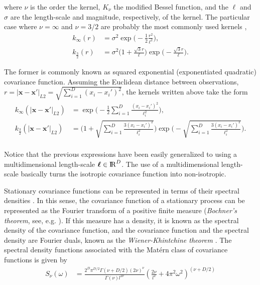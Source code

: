 \documentclass[]{interact}
\theoremstyle{plain}%
\theoremstyle{definition}
\theoremstyle{remark}
\begin{document}
\noindent where $\nu$ is the order the kernel, $K_{\nu}$ the modified Bessel function, and the $\ell$ and $\sigma$ are the length-scale and magnitude, respectively, of the kernel. The particular case where $\nu=\infty$ and $\nu=3/2$ are probably the most commonly used kernels \citep{rasmussen2006gaussian}, 
%
\begin{align*}
k_{\infty}(r)&=\sigma^2 \exp\bigg(-\frac{1}{2} \frac{r^2}{\ell^2}\bigg),  \\
k_{\frac{3}{2}}(r)&=\sigma^2\bigg(1+\frac{\sqrt{3}r}{\ell}\bigg) \exp\bigg(-\frac{\sqrt{3}r}{\ell}\bigg). 
\end{align*}

\noindent The former is commonly known as squared exponential (exponentiated quadratic) covariance function. Assuming the Euclidean distance between observations, $r=|\bm{x}-\bm{x}'|_{L2}=\sqrt{\sum_{i=1}^{D}(x_i-x_i')^2}$, the kernels written above take the form
%
\begin{align*}
k_{\infty}(|\bm{x}-\bm{x}'|_{L2})&=\exp\bigg(-\frac{1}{2} \sum_{i=1}^{D}\frac{(x_i-x_i')^2}{\ell_i^2}\bigg),\\
k_{\frac{3}{2}}(|\bm{x}-\bm{x}'|_{L2})&=\Bigg(1+\sqrt{\sum_{i=1}^{D}\frac{3(x_i-x_i')^2}{\ell_i^2}}\Bigg)\exp\Bigg(- \sqrt{\sum_{i=1}^{D}\frac{3(x_i-x_i')^2}{\ell_i^2}}\Bigg). \\
\end{align*}

\noindent Notice that the previous expressions have been easily generalized to using a multidimensional length-scale $\bm{\ell}\in {\rm I\!R}^D$. The use of a multidimensional length-scale basically turns the isotropic covariance function into non-isotropic. 

Stationary covariance functions can be represented in terms of their spectral densities \citep{rasmussen2006gaussian}. In this sense, the covariance function of a stationary process can be represented as the Fourier transform of a positive finite measure (\textit{Bochner's theorem}, see, e.g. \cite{akhiezer1993theory}). If this measure has a density, it is known as the spectral density of the covariance function, and the covariance function and the spectral density are Fourier duals, known as the \textit{Wiener-Khintchine theorem} \citep{rasmussen2006gaussian}. The spectral density functions associated with the Mat\'ern class of covariance functions is given by
%
\begin{align*}
S_{\nu}(\omega)&= \frac{2^D\pi^{D/2}\Gamma(\nu+D/2)(2\nu)^{\nu}}{\Gamma(\nu)l^{2\nu}}\left(\frac{2\nu}{l^2}+4\pi^2\omega^2 \right)^{(\nu+D/2)}
\end{align*}
\end{document}
